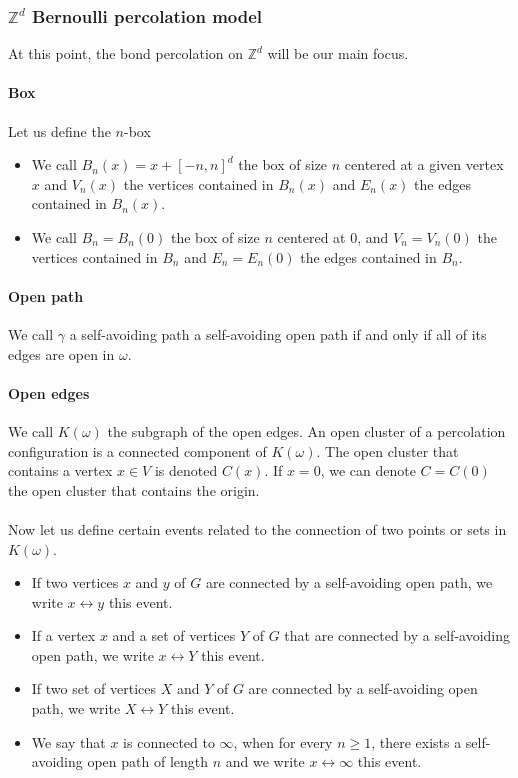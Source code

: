 \documentclass[a4paper,11pt]{article}
\theoremstyle{plain}
\theoremstyle{definition}
\theoremstyle{remark}
\begin{document}
\subsubsection{$\mathbb{Z}^d$ Bernoulli percolation model}
At this point, the bond percolation on $\mathbb{Z}^d$ will be our main focus.

\paragraph{Box}
Let us define the $n$-box
\begin{itemize}
    \item We call  $B_n(x) = x + [-n, n]^d$ the box of size $n$ centered at a given vertex $x$ and $V_n(x)$ the vertices contained in $B_n(x)$ and $E_n(x)$ the edges contained in $B_n(x)$.
    \item We call $B_n = B_n(0)$ the box of size $n$ centered at $0$, and $V_n = V_n(0)$ the vertices contained in $B_n$ and $E_n = E_n(0)$ the edges contained in $B_n$.
\end{itemize}

\paragraph{Open path}
We call $\gamma$ a self-avoiding path a self-avoiding open path if and only if all of its edges are open in $\omega$.

\paragraph{Open edges}
We call $K(\omega)$ the subgraph of the open edges. An open cluster of a percolation configuration is a connected component of $K(\omega)$. The open cluster that contains a vertex $x \in V$ is denoted $C(x)$. If $x = 0$, we can denote $C = C(0)$ the open cluster that contains the origin.

\paragraph{}
Now let us define certain events related to the connection of two points or sets in $K(\omega)$.
\begin{itemize}
    \item If two vertices $x$ and $y$ of $G$ are connected by a self-avoiding open path, we write $x \longleftrightarrow y$ this event.
    \item If a vertex $x$ and a set of vertices $Y$ of $G$ that are connected by a self-avoiding open path, we write $x \longleftrightarrow Y$ this event.
    \item If two set of vertices $X$ and $Y$ of $G$ are connected by a self-avoiding open path, we write $X \longleftrightarrow Y$ this event.
    \item We say that $x$ is connected to $\infty$, when for every $n \geq 1$, there exists a self-avoiding open path of length $n$ and we write $x \longleftrightarrow \infty$ this event.
\end{itemize}
\end{document}
